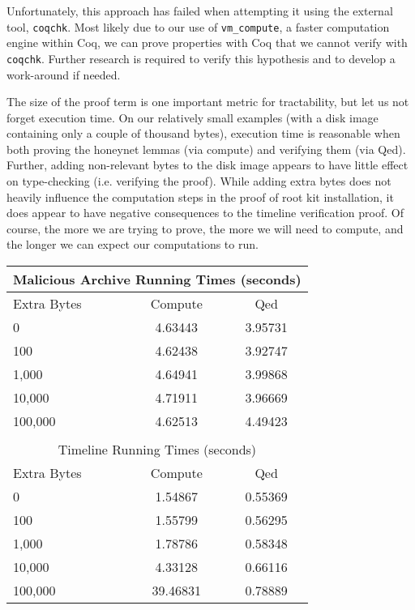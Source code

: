 \documentclass[nocopyrightspace,preprint]{sigplanconf}
\begin{document}
Unfortunately, this approach has failed when attempting it using the external
tool, {\tt coqchk}. Most likely due to our use of {\tt vm\_compute}, a faster
computation engine within Coq, we can prove properties with Coq that we cannot
verify with {\tt coqchk}. Further research is required to verify this
hypothesis and to develop a work-around if needed.

The size of the proof term is one important metric for tractability, but let
us not forget execution time. On our relatively small examples (with a disk
image containing only a couple of thousand bytes), execution time is
reasonable when both proving the honeynet lemmas (via compute) and verifying
them (via Qed). Further, adding non-relevant bytes to the disk image appears
to have little effect on type-checking (i.e. verifying the proof). While
adding extra bytes does not heavily influence the computation steps in the
proof of root kit installation, it does appear to have negative consequences
to the timeline verification proof. Of course, the more we are trying to
prove, the more we will need to compute, and the longer we can expect our
computations to run.

\begin{center}
  \begin{tabular}{|l|c|c|}
    \hline
    \multicolumn{3}{|c|}{Malicious Archive Running Times (seconds)}\\
    \hline
    Extra Bytes & Compute & Qed\\
    \hline
    0 & 4.63443 & 3.95731\\
  100 & 4.62438 & 3.92747\\
  1,000 & 4.64941 & 3.99868\\
 10,000 & 4.71911 & 3.96669\\
100,000 & 4.62513 & 4.49423\\
    \hline
    \multicolumn{3}{c}{}\\
    \hline
    \multicolumn{3}{|c|}{Timeline Running Times (seconds)}\\
    \hline
    Extra Bytes & Compute & Qed\\
    \hline
    0 & 1.54867 & 0.55369\\
  100 & 1.55799 & 0.56295\\
  1,000 & 1.78786 & 0.58348\\
 10,000 & 4.33128 & 0.66116\\
100,000 & 39.46831 & 0.78889\\
    \hline
  \end{tabular}
\end{center}
\end{document}
